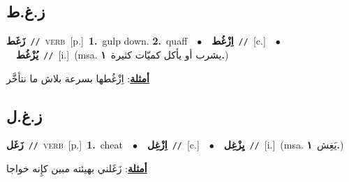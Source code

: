 \documentclass[10pt,a4paper,twoside]{article} %
\begin{document}
\begin{multicols}{2}
\vspace{-3mm}
\subsection*{\color{blue}\foreignlanguage{arabic}{ز.غ.ط}\color{blue}{}} 

{\setlength\topsep{0pt}\textbf{\foreignlanguage{arabic}{زَغَط}}\ {\color{gray}\texttt{//}\color{black}}\ \textsc{verb}\ [p.]\ \textbf{1.}~gulp down.  \textbf{2.}~quaff\ \ $\bullet$\ \ \setlength\topsep{0pt}\textbf{\foreignlanguage{arabic}{اِزْغُط}}\ {\color{gray}\texttt{//}\color{black}}\ [c.]\ \ $\bullet$\ \ \setlength\topsep{0pt}\textbf{\foreignlanguage{arabic}{يُزْغُط}}\ {\color{gray}\texttt{//}\color{black}}\ [i.]\ \color{gray}(msa. \foreignlanguage{arabic}{يشرب أو يأكل كميّات كثيرة}~\foreignlanguage{arabic}{\textbf{١.}})\color{black}\  \begin{flushright}\color{gray}\foreignlanguage{arabic}{\textbf{\underline{\foreignlanguage{arabic}{أمثلة}}}: اِزْغُطها بسرعة بلاش ما نتأخَّر}\end{flushright}\color{black}} \vspace{2mm}

\vspace{-3mm}
\subsection*{\color{blue}\foreignlanguage{arabic}{ز.غ.ل}\color{blue}{}} 

{\setlength\topsep{0pt}\textbf{\foreignlanguage{arabic}{زَغَل}}\ {\color{gray}\texttt{//}\color{black}}\ \textsc{verb}\ [p.]\ \textbf{1.}~cheat\ \ $\bullet$\ \ \setlength\topsep{0pt}\textbf{\foreignlanguage{arabic}{اِزْغِل}}\ {\color{gray}\texttt{//}\color{black}}\ [c.]\ \ $\bullet$\ \ \setlength\topsep{0pt}\textbf{\foreignlanguage{arabic}{يِزْغِل}}\ {\color{gray}\texttt{//}\color{black}}\ [i.]\ \color{gray}(msa. \foreignlanguage{arabic}{يَغِش}~\foreignlanguage{arabic}{\textbf{١.}})\color{black}\  \begin{flushright}\color{gray}\foreignlanguage{arabic}{\textbf{\underline{\foreignlanguage{arabic}{أمثلة}}}: زَغَلني بهيئته مبين كإِنه خواجا}\end{flushright}\color{black}} \vspace{2mm}


\end{multicols}
\end{document}
